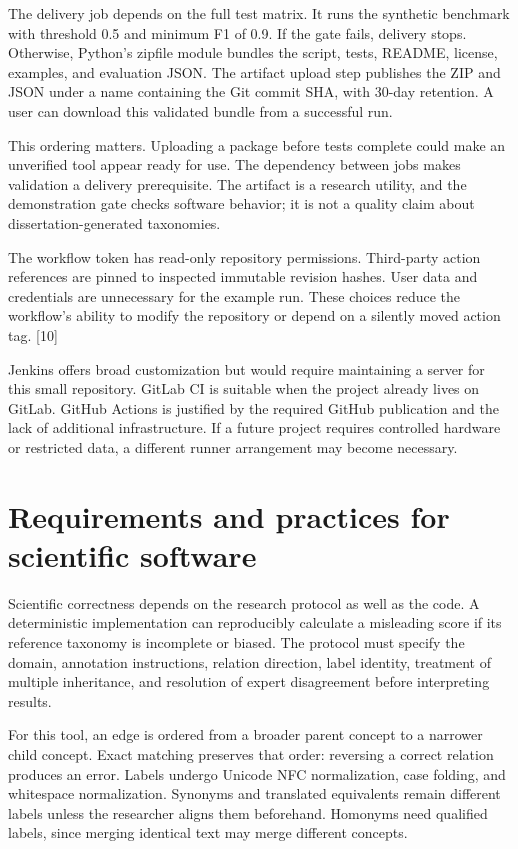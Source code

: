 \documentclass[12pt,a4paper]{article}
\newcommand{\source}[1]{\textnormal{[#1]}}
\begin{document}
The delivery job depends on the full test matrix. It runs the synthetic benchmark with threshold 0.5 and minimum F1 of 0.9. If the gate fails, delivery stops. Otherwise, Python's zipfile module bundles the script, tests, README, license, examples, and evaluation JSON. The artifact upload step publishes the ZIP and JSON under a name containing the Git commit SHA, with 30-day retention. A user can download this validated bundle from a successful run.

This ordering matters. Uploading a package before tests complete could make an unverified tool appear ready for use. The dependency between jobs makes validation a delivery prerequisite. The artifact is a research utility, and the demonstration gate checks software behavior; it is not a quality claim about dissertation-generated taxonomies.

The workflow token has read-only repository permissions. Third-party action references are pinned to inspected immutable revision hashes. User data and credentials are unnecessary for the example run. These choices reduce the workflow's ability to modify the repository or depend on a silently moved action tag. \source{10}

Jenkins offers broad customization but would require maintaining a server for this small repository. GitLab CI is suitable when the project already lives on GitLab. GitHub Actions is justified by the required GitHub publication and the lack of additional infrastructure. If a future project requires controlled hardware or restricted data, a different runner arrangement may become necessary.

\clearpage
\section{Requirements and practices for scientific software}
Scientific correctness depends on the research protocol as well as the code. A deterministic implementation can reproducibly calculate a misleading score if its reference taxonomy is incomplete or biased. The protocol must specify the domain, annotation instructions, relation direction, label identity, treatment of multiple inheritance, and resolution of expert disagreement before interpreting results.

For this tool, an edge is ordered from a broader parent concept to a narrower child concept. Exact matching preserves that order: reversing a correct relation produces an error. Labels undergo Unicode NFC normalization, case folding, and whitespace normalization. Synonyms and translated equivalents remain different labels unless the researcher aligns them beforehand. Homonyms need qualified labels, since merging identical text may merge different concepts.
\end{document}
